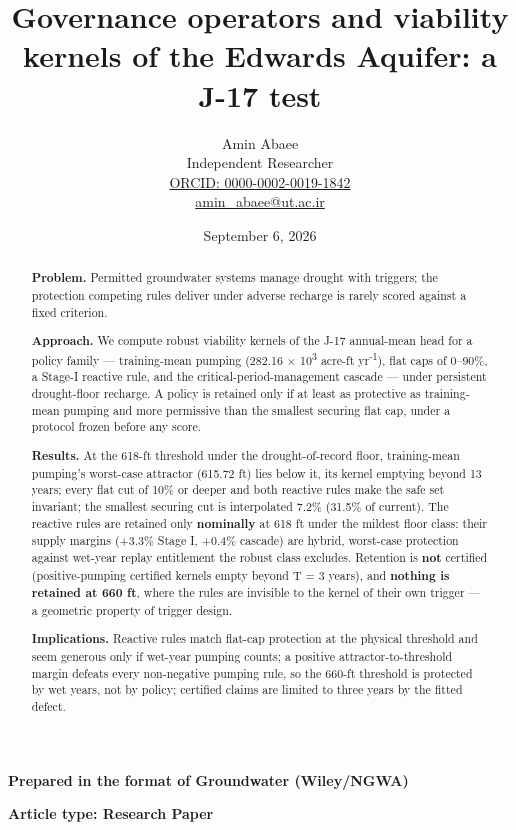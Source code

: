 \documentclass[11pt]{article}
\begin{document}
\title{Governance operators and viability kernels of the Edwards Aquifer: a J-17 test}
\author{Amin Abaee\\[0.35em]
{\small Independent Researcher}\\[0.55em]
{\small\href{https://orcid.org/0000-0002-0019-1842}{ORCID: 0000-0002-0019-1842}}\\[0.3em]
{\small\href{mailto:amin\_abaee@ut.ac.ir}{amin\_abaee@ut.ac.ir}}}
\date{September 6, 2026}
\maketitle

{\centering\small \textbf{Prepared in the format of Groundwater (Wiley/NGWA)}\par}
{\centering\small \textbf{Article type: Research Paper}\par}

\begin{abstract}


\textbf{Problem.} Permitted groundwater systems manage drought with triggers; the protection competing rules deliver under adverse recharge is rarely scored against a fixed criterion.

\textbf{Approach.} We compute robust viability kernels of the J-17 annual-mean head for a policy family --- training-mean pumping (282.16 \ensuremath{\times} 10\textsuperscript{3} acre-ft yr\textsuperscript{-1}), flat caps of 0--90\%, a Stage-I reactive rule, and the critical-period-management cascade --- under persistent drought-floor recharge. A policy is retained only if at least as protective as training-mean pumping and more permissive than the smallest securing flat cap, under a protocol frozen before any score.

\textbf{Results.} At the 618-ft threshold under the drought-of-record floor, training-mean pumping's worst-case attractor (615.72 ft) lies below it, its kernel emptying beyond 13 years; every flat cut of 10\% or deeper and both reactive rules make the safe set invariant; the smallest securing cut is interpolated 7.2\% (31.5\% of current). The reactive rules are retained only \textbf{nominally} at 618 ft under the mildest floor class: their supply margins (+3.3\% Stage I, +0.4\% cascade) are hybrid, worst-case protection against wet-year replay entitlement the robust class excludes. Retention is \textbf{not} certified (positive-pumping certified kernels empty beyond T = 3 years), and \textbf{nothing is retained at 660 ft}, where the rules are invisible to the kernel of their own trigger --- a geometric property of trigger design.

\textbf{Implications.} Reactive rules match flat-cap protection at the physical threshold and seem generous only if wet-year pumping counts; a positive attractor-to-threshold margin defeats every non-negative pumping rule, so the 660-ft threshold is protected by wet years, not by policy; certified claims are limited to three years by the fitted defect.

\end{abstract}
\end{document}
